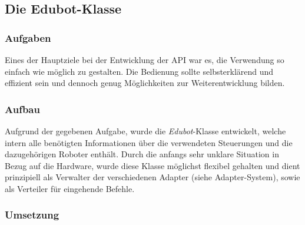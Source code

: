 
\subsection{Die Edubot-Klasse}

\subsubsection{Aufgaben}
Eines der Hauptziele bei der Entwicklung der API war es, die Verwendung so einfach wie möglich zu gestalten. Die Bedienung sollte selbsterklärend und effizient sein und dennoch genug Möglichkeiten zur Weiterentwicklung bilden.

\subsubsection{Aufbau}
Aufgrund der gegebenen Aufgabe, wurde die \textit{Edubot}-Klasse entwickelt, welche intern alle benötigten Informationen über die verwendeten Steuerungen und die dazugehörigen Roboter enthält. Durch die anfangs sehr unklare Situation in Bezug auf die Hardware, wurde diese Klasse möglichst flexibel gehalten und dient prinzipiell als Verwalter der verschiedenen Adapter (siehe Adapter-System), sowie als Verteiler für eingehende Befehle.

\subsubsection{Umsetzung}

